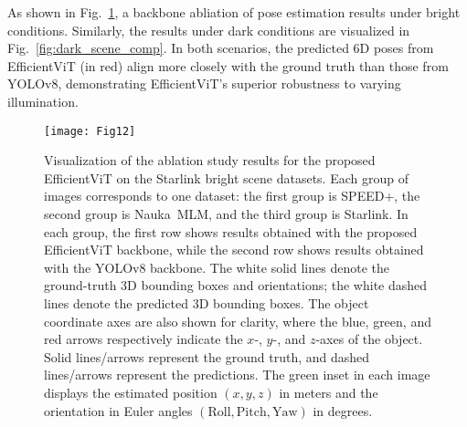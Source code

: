 \documentclass[a4paper,fleqn]{cas-sc}
\begin{document}
As shown in Fig.~\ref{fig:bright_scene_comp}, a backbone abliation of pose estimation results under bright conditions. Similarly, the results under dark conditions are visualized in Fig.~\ref{fig:dark_scene_comp}. In both scenarios, the predicted 6D poses from EfficientViT (in red) align more closely with the ground truth than those from YOLOv8, demonstrating EfficientViT’s superior robustness to varying illumination.






\begin{table}[!htbp]
    \centering
    \caption{EfficientViT Ablation on SPEED+, Nauka MLM, Starlink synthetic datasets under Different Light Intensities}
    \label{tab:EfficientViT Abliation_light}
\end{table}


\begin{figure}[!htbp]
    \centering
    \texttt{[image: Fig12]}
    \caption{Visualization of the ablation study results for the proposed EfficientViT on the Starlink bright scene datasets. 
    Each group of images corresponds to one dataset: the first group is SPEED+, the second group is Nauka~MLM, and the third group is Starlink. 
    In each group, the first row shows results obtained with the proposed EfficientViT backbone, while the second row shows results obtained with the YOLOv8 backbone. 
    The white solid lines denote the ground-truth 3D bounding boxes and orientations; the white dashed lines denote the predicted 3D bounding boxes. 
    The object coordinate axes are also shown for clarity, where the blue, green, and red arrows respectively indicate the $x$-, $y$-, and $z$-axes of the object. 
    Solid lines/arrows represent the ground truth, and dashed lines/arrows represent the predictions. 
    The green inset in each image displays the estimated position $(x,y,z)$ in meters and the orientation in Euler angles $(\mathrm{Roll}, \mathrm{Pitch}, \mathrm{Yaw})$ in degrees.}
    \label{fig:bright_scene_comp}
\end{figure}
\end{document}
